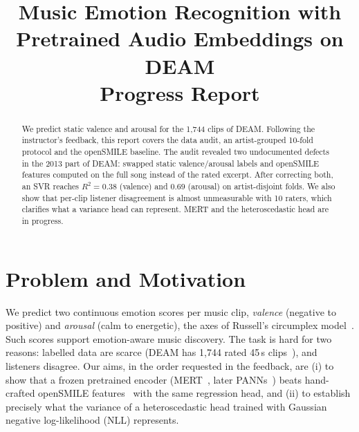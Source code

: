 \documentclass[conference]{IEEEtran}
\newcommand{\R}{R^2}
\begin{document}
\title{Music Emotion Recognition with Pretrained Audio Embeddings on DEAM\\[0.3em]
\large Progress Report}

\author{
}

\maketitle

\begin{abstract}
We predict static valence and arousal for the 1{,}744 clips of DEAM. Following
the instructor's feedback, this report covers the data audit, an artist-grouped
10-fold protocol and the openSMILE baseline. The audit revealed two
undocumented defects in the 2013 part of DEAM: swapped static valence/arousal
labels and openSMILE features computed on the full song instead of the rated
excerpt. After correcting both, an SVR reaches $\R=0.38$ (valence) and $0.69$
(arousal) on artist-disjoint folds. We also show that per-clip listener
disagreement is almost unmeasurable with 10 raters, which clarifies what a
variance head can represent. MERT and the heteroscedastic head are in progress.
\end{abstract}

\section{Problem and Motivation}
We predict two continuous emotion scores per music clip, \emph{valence}
(negative to positive) and \emph{arousal} (calm to energetic), the axes of
Russell's circumplex model~\cite{russell1980}. Such scores support
emotion-aware music discovery. The task is hard for two reasons: labelled data
are scarce (DEAM has 1{,}744 rated 45\,s clips~\cite{aljanaki2017}), and
listeners disagree. Our aims, in the order requested in the feedback, are
(i) to show that a frozen pretrained encoder (MERT~\cite{li2024mert}, later
PANNs~\cite{kong2020}) beats hand-crafted openSMILE features~\cite{eyben2010}
with the same regression head, and (ii) to establish precisely what the
variance of a heteroscedastic head trained with Gaussian negative
log-likelihood (NLL) represents.
\end{document}
